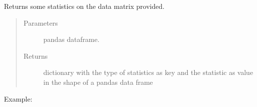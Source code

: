 \documentclass[letterpaper,10pt,english]{sphinxmanual}
\begin{document}

\begin{fulllineitems}
\label{\detokenize{_autosummary/analytics_core.analytics:analytics_core.analytics.analytics.get_summary_data_matrix}}
Returns some statistics on the data matrix provided.
\begin{quote}\begin{description}
\item[{Parameters}] \leavevmode
{} \textendash{} pandas dataframe.

\item[{Returns}] \leavevmode
dictionary with the type of statistics as key and the statistic as value in the shape of a pandas data frame

\end{description}\end{quote}

Example:

\begin{sphinxVerbatim}[commandchars=\\\{\}]
  
\end{sphinxVerbatim}

\end{fulllineitems}


\begin{fulllineitems}
\label{\detokenize{_autosummary/analytics_core.analytics:analytics_core.analytics.analytics.check_equal_variances}}
\end{fulllineitems}
\end{document}

